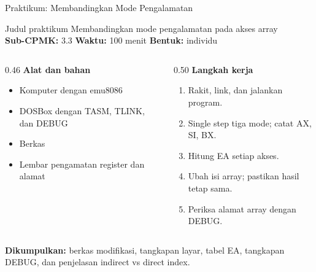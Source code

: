 \documentclass[aspectratio=169,11pt]{beamer}
\begin{document}
\begin{frame}{Praktikum: Membandingkan Mode Pengalamatan}
\begin{block}{Judul praktikum}
\small Membandingkan mode pengalamatan pada akses array\\[0.15em]
\textbf{Sub-CPMK:} 3.3 \quad\textbullet\quad
\textbf{Waktu:} 100 menit \quad\textbullet\quad
\textbf{Bentuk:} individu
\end{block}

\vspace{0.2em}
\begin{columns}[t]
\begin{column}{0.46\textwidth}
{\color{obeBlue}\bfseries Alat dan bahan}
\begin{itemize}\footnotesize
    \item Komputer dengan emu8086
    \item DOSBox dengan TASM, TLINK, dan DEBUG
    \item Berkas 
    \item Lembar pengamatan register dan alamat
\end{itemize}
\end{column}
\begin{column}{0.50\textwidth}
{\color{obeBlue}\bfseries Langkah kerja}
\begin{enumerate}\footnotesize
    \item Rakit, link, dan jalankan program.
    \item Single step tiga mode; catat AX, SI, BX.
    \item Hitung EA setiap akses.
    \item Ubah isi array; pastikan hasil tetap sama.
    \item Periksa alamat array dengan DEBUG.
\end{enumerate}
\end{column}
\end{columns}

\vspace{0.2em}
{\footnotesize\textbf{Dikumpulkan:} berkas  modifikasi,
tangkapan layar, tabel EA, tangkapan DEBUG, dan penjelasan indirect
vs direct index.\par}
\end{frame}
\end{document}
